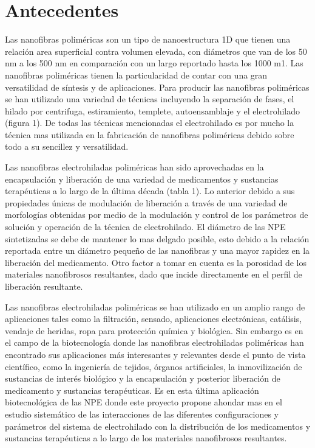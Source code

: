 \documentclass[a4paper,fleqn]{cas-sc}
\begin{document}
\section{Antecedentes}

Las nanofibras poliméricas son un tipo de nanoestructura 1D que tienen una relación area superficial contra volumen elevada, con diámetros que van de los 50 nm a los 500 nm en comparación con un largo reportado hasta los 1000 m1. Las nanofibras poliméricas tienen la particularidad de contar con una gran versatilidad de síntesis y de aplicaciones. Para producir las nanofibras poliméricas se han utilizado una variedad de técnicas incluyendo la separación de fases, el hilado por centrifuga, estiramiento, templete, autoensamblaje y el electrohilado (figura 1). De todas las técnicas mencionadas el electrohilado es por mucho la técnica mas utilizada en la fabricación de nanofibras poliméricas debido sobre todo a su sencillez y versatilidad.



Las nanofibras electrohiladas poliméricas han sido aprovechadas en la encapsulación y liberación de una variedad de medicamentos y sustancias terapéuticas a lo largo de la última década (tabla 1). Lo anterior debido a sus propiedades únicas de modulación de liberación a través de una variedad de morfologías obtenidas por medio de la modulación y control de los parámetros de solución y operación de la técnica de electrohilado. El diámetro de las NPE sintetizadas se debe de mantener lo mas delgado posible, esto debido a la relación reportada entre un diámetro pequeño de las nanofibras y una mayor rapidez en la liberación del medicamento. Otro factor a tomar en cuenta es la porosidad de los materiales nanofibrosos resultantes, dado que incide directamente en el perfil de liberación resultante.

Las nanofibras electrohiladas poliméricas se han utilizado en un amplio rango de aplicaciones tales como la filtración, sensado, aplicaciones electrónicas, catálisis, vendaje de heridas, ropa para protección química y biológica. Sin embargo es en el campo de la biotecnología donde las nanofibras electrohiladas poliméricas han encontrado sus aplicaciones más interesantes y relevantes desde el punto de vista científico, como la ingeniería de tejidos, órganos artificiales, la inmovilización de sustancias de interés biológico y la encapsulación y posterior liberación de medicamento y sustancias terapéuticas. Es en esta última aplicación biotecnológica de las NPE donde este proyecto propone ahondar mas en el estudio sistemático de las interacciones de las diferentes configuraciones y parámetros del sistema de electrohilado con la distribución de los medicamentos y sustancias terapéuticas a lo largo de los materiales nanofibrosos resultantes.
\end{document}
